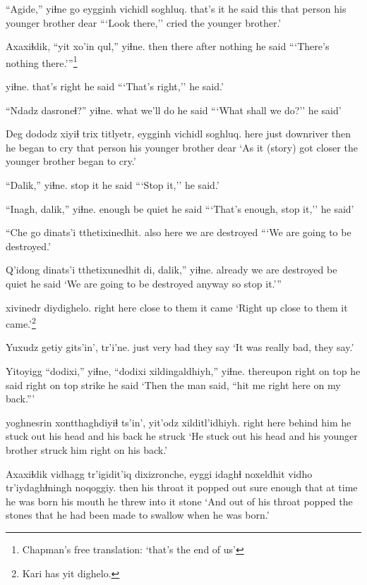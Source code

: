 \documentclass[12pt]{article}
\begin{document}
\gll ``Agide,'' yiɬne  go eygginh vichidl  soghluq.
{that's it}  {he said}  this {that person} {his younger brother} dear
\glt ```Look there,'' cried the younger brother.'
\glend

\gll Axaxiɬdik, ``yit xo'in qul,''  yiɬne.
then  there after nothing {he said}
\glt ```There's nothing there.'''\footnote{Chapman's free translation: `that's the end of us'}
\glend

 yiɬne.
{that's right} {he said}
\glt ```That's right,'' he said.'
\glend

\gll ``Ndadz dasroneɬ?'' yiɬne.
what {we'll do} {he said}
\glt ```What shall we do?'' he said'
\glend

\gll Deg dododz xiyiɬ {trix titlyetr,} eygginh vichidl  soghluq.
here {just downriver} then {he began to cry } {that person} {his younger brother} dear
\glt `As it (story) got closer the younger brother began to cry.'
\glend

\gll ``Dalik,'' yiɬne.
{stop it} {he said}
\glt ```Stop it,'' he said.'
\glend

\gll ``Inagh, dalik,'' yiɬne.
enough  {be quiet} {he said}
\glt ```That's enough, stop it,'' he said'
\glend

\gll ``Che go {dinats'i tthetixinedhit.}
also here {we are destroyed}
\glt ```We are going to be destroyed.'
\glend

\gll Q'idong {dinats'i tthetixunedhit di,} dalik,'' yiɬne.
already  {we are destroyed} {be quiet} {he said}
\glt `We are going to be destroyed anyway so stop it.'''
\glend

 xivinedr diydighelo.
{right here} {close to them} {it came}
\glt `Right up close to them it came.'\footnote{Kari has yit dighelo.}
\glend

\gll Yuxudz getiy  gits'in', tr'i'ne.
just  very  bad  {they say}
\glt `It was really bad, they say.'
\glend

\gll Yitoyigg ``dodixi,'' yiɬne, ``dodixi xildingaldhiyh,'' yiɬne.
thereupon {right on top}  {he said} {right on top} strike  {he said}
\glt `Then the man said, ``hit me right here on my back.'''
\glend

 yoghnesrin xontthaghdiyiɬ ts'in', yit'odz xilditl'idhiyh.
{right here} {behind him} {he stuck out his head} and {his back} {he struck}
\glt `He stuck out his head and his younger brother struck him right on his back.'
\glend

\gll Axaxiɬdik vidhagg tr'igidit'iq dixizronche, eyggi  idaghɬ noxeldhit vidho  tr'iydaghɬningh noqoggiy.
then  {his throat} {it popped out} {sure enough} that  {at time} {he was born} {his mouth} {he threw into it} stone
\glt `And out of his throat popped the stones that he had been made to swallow when he was born.'
\glend
\end{document}
